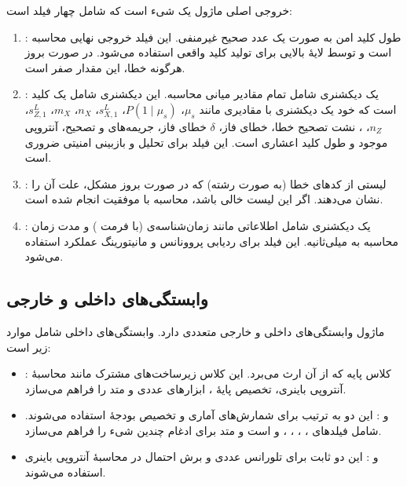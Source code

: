 خروجی اصلی ماژول یک شیء  است که شامل چهار فیلد است:

\begin{enumerate}
	\item {}: طول کلید امن به صورت یک عدد صحیح غیرمنفی. این فیلد خروجی نهایی محاسبه است و توسط لایۀ بالایی برای تولید کلید واقعی استفاده می‌شود. در صورت بروز هرگونه خطا، این مقدار صفر است.
	\item {}: یک دیکشنری شامل تمام مقادیر میانی محاسبه. این دیکشنری شامل یک کلید  است که خود یک دیکشنری با مقادیری مانند $\mu_s$، $P(1 \mid \mu_s)$، $s_{X,1}^L$، $n_X$، $m_X$، $s_{Z,1}^L$، $n_Z$، ، نشت تصحیح خطا، خطای فاز، $\delta$ خطای فاز، جریمه‌های  و تصحیح، آنتروپی موجود و طول کلید اعشاری است. این فیلد برای تحلیل و بازبینی امنیتی ضروری است.
	\item {}: لیستی از کدهای خطا (به صورت رشته) که در صورت بروز مشکل، علت آن را نشان می‌دهند. اگر این لیست خالی باشد، محاسبه با موفقیت انجام شده است.
	\item {}: یک دیکشنری شامل اطلاعاتی مانند زمان‌شناسه‌ی  (با فرمت ) و مدت زمان محاسبه به میلی‌ثانیه. این فیلد برای ردیابی پروونانس و مانیتورینگ عملکرد استفاده می‌شود.
\end{enumerate}

\subsection{وابستگی‌های داخلی و خارجی}

ماژول وابستگی‌های داخلی و خارجی متعددی دارد. وابستگی‌های داخلی شامل موارد زیر است:

\begin{itemize}
	\item {}: کلاس پایه که  از آن ارث می‌برد. این کلاس زیرساخت‌های مشترک مانند محاسبۀ آنتروپی باینری، تخصیص پایۀ \lr{$\varepsilon$}، ابزارهای  عددی و متد  را فراهم می‌سازد.
	\item {} و : این دو  به ترتیب برای شمارش‌های آماری و تخصیص بودجۀ \lr{$\varepsilon$} استفاده می‌شوند.  شامل فیلدهای ، ، ، ،  و  است و متد  برای ادغام چندین شیء  را فراهم می‌سازد.
	\item {} و : این دو ثابت برای تلورانس عددی و برش احتمال در محاسبۀ آنتروپی باینری استفاده می‌شوند.
\end{itemize}

